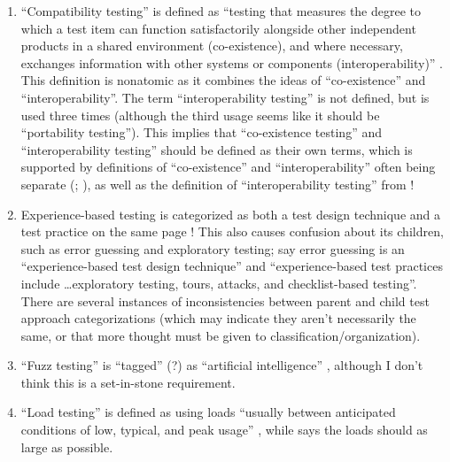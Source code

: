 \begin{enumerate}
      \item ``Compatibility testing'' is defined as ``testing that measures the
            degree to which a test item can function satisfactorily alongside
            other independent products in a shared environment (co-existence),
            and where necessary, exchanges information with other systems or
            components (interoperability)'' \cite[p.~3]{IEEE2022}. This
            definition is nonatomic as it combines the ideas of ``co-existence''
            and ``interoperability''. The term ``interoperability testing'' is
            not defined, but is used three times \cite[pp.~22, 43]{IEEE2022}
            (although the third usage seems like it should be ``portability
            testing''). This implies that ``co-existence testing'' and
            ``interoperability testing'' should be defined as their own terms,
            which is supported by definitions of ``co-existence'' and
            ``interoperability'' often being separate (;
            \citealp[pp.~73, 237]{IEEE2017}), as well as the definition of
            ``interoperability testing'' from \citet[p.~238]{IEEE2017}!
      \item Experience-based testing is categorized as both a test design
            technique and a test practice on the same page
            \citep[p.~22]{IEEE2022}! This also causes confusion about
            its children, such as error guessing and exploratory testing;
            \citet[p.~34]{IEEE2022} say error guessing is an ``experience-based
            test design technique'' and ``experience-based test practices
            include \dots exploratory testing, tours, attacks, and
            checklist-based testing''. There are several instances of
            inconsistencies between parent and child test approach
            categorizations (which may indicate they aren't necessarily the
            same, or that more thought must be given to
            classification/organization).
      \item ``Fuzz testing'' is ``tagged'' (?) as ``artificial intelligence''
            \cite[p.~5]{IEEE2022}, although I don't think this is a
            set-in-stone requirement.
      \item ``Load testing'' is defined as using loads ``usually between
            anticipated conditions of low, typical, and peak usage''
            \cite[p.~5]{IEEE2022}, while \citet[p.~86]{Patton2006} says the
            loads should as large as possible.

\end{enumerate}
